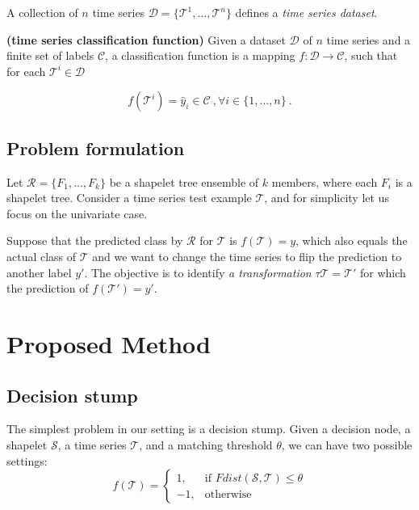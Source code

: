 \documentclass[smallextended,natbib]{svjour3}
\begin{document}
A collection of $n$ time series $\mathcal{D} = \{\mathcal{T}^{1},\ldots,\mathcal{T}^{n}\}$ defines a \emph{time series dataset}. 

\begin{definition} \textbf{(time series classification function)} %
  Given a dataset $\mathcal{D}$ of $n$ time series and a finite set of
  labels $\mathcal{C}$, a classification function is a mapping
  $f : \mathcal{D} \rightarrow \mathcal{C}$, such that for each
  $\mathcal{T}^{i}\in \mathcal{D}$

\[
f(\mathcal{T}^{i}) = \hat{y}_i\in \mathcal{C} \ ,
  \forall i\in \{1,\dots,n\} \ .
\]
\end{definition}

\subsection{Problem formulation}
Let $\mathcal{R} = \{F_1, \dots, F_k\}$ be a shapelet tree ensemble of $k$ members, where each $F_i$ is a shapelet tree. Consider a time series test example $\mathcal{T}$, and for simplicity let us focus on the univariate case. 

Suppose that the predicted class by $\mathcal{R}$ for $\mathcal{T}$ is $f(\mathcal{T}) = y$, which also equals the actual class of $\mathcal{T}$ and we want to change the time series to flip the prediction to another label $y'$. The objective is to identify \emph{a transformation} $\tau{\mathcal{T}} = \mathcal{T}'$ for which the prediction of $f(\mathcal{T}') = y'$.

\section{Proposed Method}

\subsection{Decision stump}
The simplest problem in our setting is a decision stump. Given a decision node, a shapelet $\mathcal{S}$, a time series $\mathcal{T}$, and a matching threshold $\theta$, we can have two possible settings:
\begin{equation}
f(\mathcal{T}) = 
\begin{cases}
    1,& \text{if } Fdist(\mathcal{S}, \mathcal{T}) \leq \theta\\
    -1,              & \text{otherwise}
\end{cases}
\end{equation}
\end{document}
